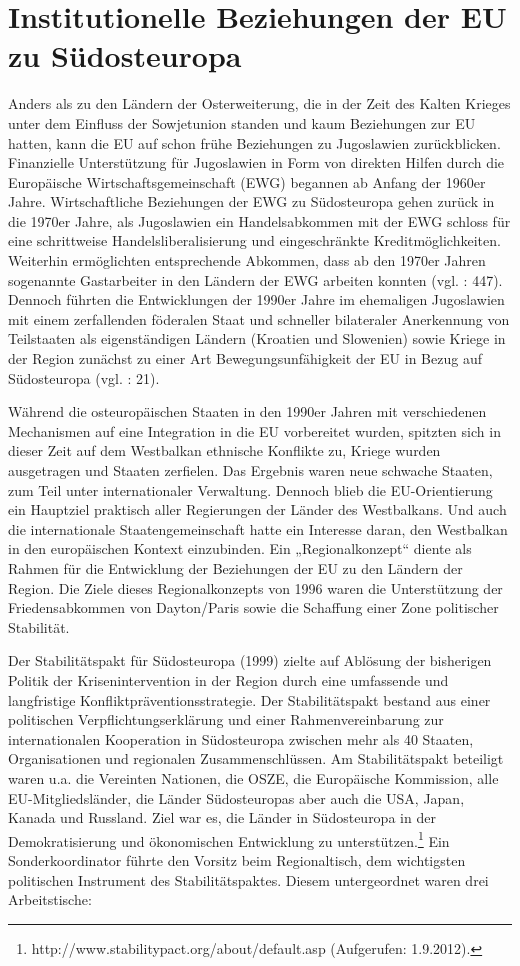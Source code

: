 \section{Institutionelle Beziehungen der EU zu Südosteuropa}
Anders als zu den Ländern der Osterweiterung, die in der Zeit des Kalten Krieges unter dem Einfluss der Sowjetunion standen und kaum Beziehungen zur EU hatten, kann die EU auf schon frühe Beziehungen zu Jugoslawien zurückblicken. Finanzielle Unterstützung für Jugoslawien in Form von direkten Hilfen durch die Europäische Wirtschaftsgemeinschaft (EWG) begannen ab Anfang der 1960er Jahre. Wirtschaftliche Beziehungen der EWG zu Südosteuropa gehen zurück in die 1970er Jahre, als Jugoslawien ein Handelsabkommen mit der EWG schloss für eine schrittweise Handelsliberalisierung und eingeschränkte Kreditmöglichkeiten. Weiterhin ermöglichten entsprechende Abkommen, dass ab den 1970er Jahren sogenannte Gastarbeiter in den Ländern der EWG arbeiten konnten (vgl. \cite{weithmann} : 447). Dennoch führten die Entwicklungen der 1990er Jahre im ehemaligen Jugoslawien mit einem zerfallenden föderalen Staat und schneller bilateraler Anerkennung von Teilstaaten als eigenständigen Ländern (Kroatien und Slowenien) sowie Kriege in der Region zunächst zu einer Art Bewegungsunfähigkeit der EU in Bezug auf Südosteuropa (vgl. \cite{inotai} : 21).\par
Während die osteuropäischen Staaten in den 1990er Jahren mit verschiedenen Mechanismen auf eine Integration in die EU vorbereitet wurden, spitzten sich in dieser Zeit auf dem Westbalkan ethnische Konflikte zu, Kriege wurden ausgetragen und Staaten zerfielen. Das Ergebnis waren neue schwache Staaten, zum Teil unter internationaler Verwaltung. Dennoch blieb die EU-Orientierung ein Hauptziel praktisch aller Regierungen der Länder des Westbalkans. Und auch die internationale Staatengemeinschaft hatte ein Interesse daran, den Westbalkan in den europäischen Kontext einzubinden. Ein „Regionalkonzept“ diente als Rahmen für die Entwicklung der Beziehungen der EU zu den Ländern der Region. Die Ziele dieses Regionalkonzepts von 1996 waren die Unterstützung der Friedensabkommen von Dayton/Paris sowie die Schaffung einer Zone politischer Stabilität.\par
Der Stabilitätspakt für Südosteuropa (1999) zielte auf Ablösung der bisherigen Politik der Krisenintervention in der Region durch eine umfassende und langfristige Konfliktpräventionsstrategie. Der Stabilitätspakt bestand aus einer politischen Verpflichtungserklärung und einer Rahmenvereinbarung zur internationalen Kooperation in Südosteuropa zwischen mehr als 40 Staaten, Organisationen und regionalen Zusammenschlüssen. Am Stabilitätspakt beteiligt waren u.a. die Vereinten Nationen, die OSZE, die Europäische Kommission, alle EU-Mitgliedsländer, die Länder Südosteuropas aber auch die USA, Japan, Kanada und Russland. Ziel war es, die Länder in Südosteuropa in der Demokratisierung und ökonomischen Entwicklung zu unterstützen.\footnote{http://www.stabilitypact.org/about/default.asp (Aufgerufen: 1.9.2012).} Ein Sonderkoordinator führte den Vorsitz beim Regionaltisch, dem wichtigsten politischen Instrument des Stabilitätspaktes. Diesem untergeordnet waren drei Arbeitstische:
